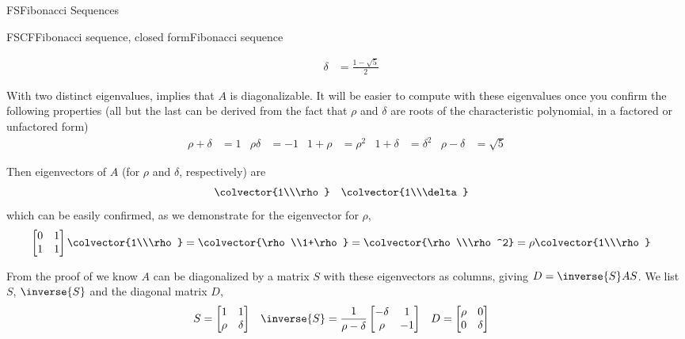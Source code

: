 \begin{subsect}{FS}{Fibonacci Sequences}
\begin{example}{FSCF}{Fibonacci sequence, closed form}{Fibonacci sequence}
\begin{para}
\begin{align*}
&
\delta&=\frac{1-\sqrt{5}}{2}
\end{align*}
\end{para}
%
\begin{para}With two distinct eigenvalues,  implies that $A$ is diagonalizable.  It will be easier to compute with these eigenvalues once you confirm the following properties (all but the last can be derived from the fact that $\rho$ and $\delta$ are roots of the characteristic polynomial, in a factored or unfactored form)
%
\begin{align*}
\rho+\delta&=1
&
\rho\delta&=-1
&
1+\rho&=\rho^2
&
1+\delta&=\delta^2
&
\rho-\delta&=\sqrt{5}
\end{align*}
\end{para}
%
\begin{para}Then eigenvectors of $A$ (for $\rho$ and $\delta$, respectively) are
%
\begin{align*}
&\colvector{1\\\rho}
&
&\colvector{1\\\delta}
\end{align*}
%
which can be easily confirmed, as we demonstrate for the eigenvector for $\rho$,
%
\begin{align*}
\begin{bmatrix}0&1\\1&1\end{bmatrix}\colvector{1\\\rho}
&
=\colvector{\rho\\1+\rho}
=\colvector{\rho\\\rho^2}
=\rho\colvector{1\\\rho}
\end{align*}
\end{para}
%
\begin{para}From the proof of  we know $A$ can be diagonalized by a matrix $S$ with these eigenvectors as columns, giving $D=\inverse{S}AS$.  We list $S$, $\inverse{S}$ and the diagonal matrix $D$,
%
\begin{align*}
S&=\begin{bmatrix}1&1\\\rho&\delta\end{bmatrix}
&
\inverse{S}&=\frac{1}{\rho-\delta}\begin{bmatrix}-\delta&1\\\rho&-1\end{bmatrix}
&
D&=\begin{bmatrix}\rho&0\\0&\delta\end{bmatrix}

\end{align*}
\end{para}
\end{example}
\end{subsect}
